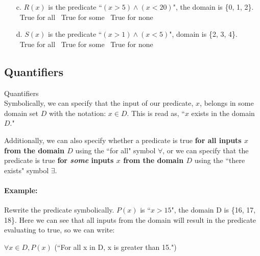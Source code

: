 {\begin{questionNOGRADE}{\thequestion}
\begin{enumerate}
            \item[c.] $R(x)$ is the predicate ``$(x > 5) \land (x < 20)$", the domain is \{0, 1, 2\}.
                        ~\\
                        \Square \ True for all \tab \Square \ True for some \tab \Square \ True for none \\
                        
            \item[d.] $S(x)$ is the predicate ``$(x > 1) \land (x < 5)$", domain is \{2, 3, 4\}.
                        ~\\
                        \Square \ True for all \tab \Square \ True for some \tab \Square \ True for none \\
        \end{enumerate}
    \end{questionNOGRADE}

    \newpage

    \subsection{Quantifiers}

    \begin{intro}{Quantifiers\\}
        Symbolically, we can specify that the input of our predicate, $x$,
        belongs in some domain set $D$ with the notation: $x \in D$.
        This is read as, ``$x$ exists in the domain $D$."

        Additionally, we can also specify whether a predicate is true
        \textbf{for all inputs $x$ from the domain $D$} using the ``for all"
        symbol $\forall$, or we can specify that the predicate is true
        \textbf{for \textit{some} inputs $x$ from the domain $D$} using
        the ``there exists" symbol $\exists$.{}

        \paragraph{Example:} Rewrite the predicate symbolically.
            $P(x)$ is ``$x > 15$", the domain D is \{16, 17, 18\}.
            Here we can see that all inputs from the domain will
            result in the predicate evaluating to true, so we can write:

            \begin{center}
                $ \forall x \in D, P(x) $ (``For all x in D, x is greater than 15.")
            \end{center}


\end{intro}}
